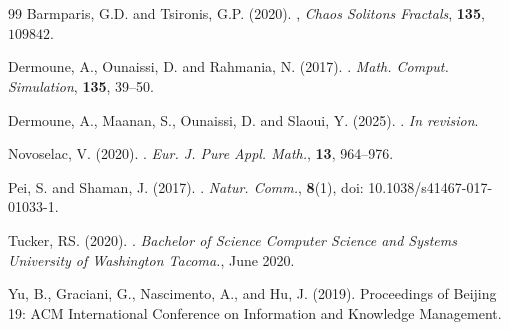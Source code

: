 \documentclass[12pt,a4paper]{article}
\begin{document}
	\clearpage
	\section*{}
	\makeatletter
	\renewcommand{\@biblabel}[1]{}
	\makeatother
	\begin{thebibliography}{99}
		 Barmparis, G.D. and Tsironis, G.P. (2020). , \newblock \textit{Chaos Solitons Fractals}, {\bf 135}, $109842$.
		
		Dermoune, A., Ounaissi, D.  and Rahmania, N. (2017).
		.
		\newblock \textit{Math. Comput. Simulation}, {\bf 135}, 39--50.
		
		Dermoune, A., Maanan, S., Ounaissi, D.  and Slaoui, Y. (2025).
		.  \newblock \textit{In revision}.
		
		Novoselac, V. (2020).
		.
		\newblock \textit{Eur. J. Pure Appl. Math.}, {\bf 13}, 964--976.
		
		 Pei, S. and Shaman, J. (2017). 
		. 
		\newblock \textit{Natur. Comm.}, {\bf 8}(1), doi: 10.1038/s41467-017-01033-1.  
		
		 Tucker, RS. (2020).
		. 
		\newblock \textit{Bachelor of Science Computer Science and Systems University of Washington Tacoma.}, June 2020. 
		
		 Yu, B., Graciani, G., Nascimento, A., and Hu, J. (2019).
		\newblock Proceedings of Beijing 19: ACM International Conference on Information and Knowledge Management. 
		
	\end{thebibliography}
	
\end{document}

